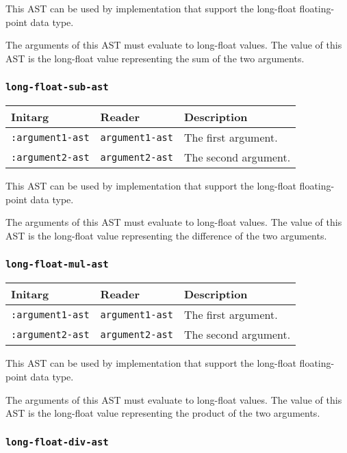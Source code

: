 This AST can be used by implementation that support the long-float
floating-point data type.  

The arguments of this AST must evaluate to long-float
values.  The value of this AST is the long-float value
representing the sum of the two arguments.

\subsubsection{\texttt{long-float-sub-ast}}
\label{sec-ast-long-float-sub}

\begin{tabular}{|l|l|l|}
\hline
Initarg & Reader & Description\\
\hline\hline
\texttt{:argument1-ast} & \texttt{argument1-ast} & The first argument.\\
\hline
\texttt{:argument2-ast} & \texttt{argument2-ast} & The second argument.\\
\hline
\end{tabular}

This AST can be used by implementation that support the long-float
floating-point data type.  

The arguments of this AST must evaluate to long-float
values.  The value of this AST is the long-float value
representing the difference of the two arguments.

\subsubsection{\texttt{long-float-mul-ast}}
\label{sec-ast-long-float-mul}

\begin{tabular}{|l|l|l|}
\hline
Initarg & Reader & Description\\
\hline\hline
\texttt{:argument1-ast} & \texttt{argument1-ast} & The first argument.\\
\hline
\texttt{:argument2-ast} & \texttt{argument2-ast} & The second argument.\\
\hline
\end{tabular}

This AST can be used by implementation that support the long-float
floating-point data type.  

The arguments of this AST must evaluate to long-float
values.  The value of this AST is the long-float value
representing the product of the two arguments.

\subsubsection{\texttt{long-float-div-ast}}
\label{sec-ast-long-float-div}

